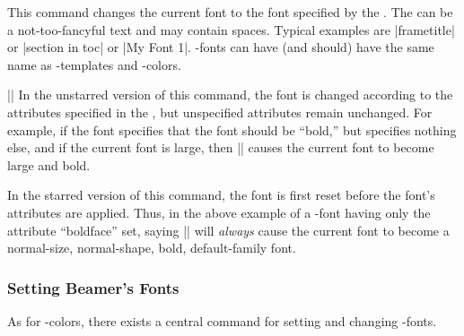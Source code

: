 \begin{command}{\usebeamerfont\opt{|*|}}
  This command changes the current font to the font specified by the . The  can be a not-too-fancyful text and may contain spaces. Typical examples are |frametitle| or |section in toc| or |My Font 1|. \beamer-fonts can have (and should) have the same name as \beamer-templates and \beamer-colors.

  \example ||
  In the unstarred version of this command, the font is changed according to the attributes specified in the , but unspecified attributes remain unchanged. For example, if the font specifies that the font should be ``bold,'' but specifies nothing else, and if the current font is large, then |\usebeamerfont| causes the current font to become large and bold.

  In the starred version of this command, the font is first reset before the font's attributes are applied. Thus, in the above example of a \beamer-font having only the attribute ``boldface'' set, saying |\usebeamerfont*| will \emph{always} cause the current font to become a normal-size, normal-shape, bold, default-family font.
\end{command}


\subsubsection{Setting Beamer's Fonts}

As for \beamer-colors, there exists a central command for setting and
changing \beamer-fonts.

